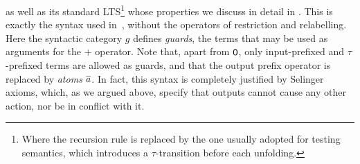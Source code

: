 as well as its standard LTS\footnote{Where the recursion rule is replaced by the one
    usually adopted for testing semantics, which introduces a
    $\tau$-transition before each unfolding.}  whose properties we
discuss in detail in .  This is exactly the syntax used
in~\cite{DBLP:conf/concur/Selinger97,DBLP:journals/iandc/BorealeNP02},
without the operators of restriction and relabelling.
Here the syntactic
category $g$ defines \emph{guards}, \ie the terms that may be used as
arguments for the $+$ operator.  Note that, apart from $\mathop{\textsf{0}}$, only
input-prefixed and $\tau$-prefixed terms are allowed as guards, and
that the output prefix operator is replaced by \emph{atoms} $\overline{a}$.
In fact, this syntax is
completely justified by Selinger axioms, which, as we argued above,
specify that outputs cannot cause any other action, nor be in
conflict with it.







